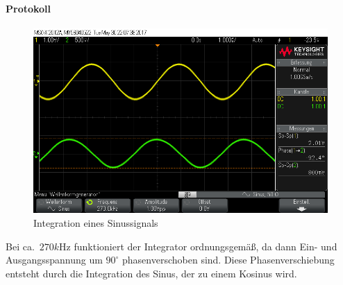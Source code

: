 \documentclass[10pt]{scrreprt}
\begin{document}
    \paragraph{Protokoll}
    \begin{center}
        \begin{figure}[H]
            \includegraphics[width=\textwidth]{scope_7.png}
            \caption{Integration eines Sinussignals}
        \end{figure}
    \end{center}

    Bei ca.~$270\si{k\hertz}$ funktioniert der Integrator ordnungsgemäß, da dann
    Ein- und Ausgangsspannung um $90^\circ$ phasenverschoben sind.
    Diese Phasenverschiebung entsteht durch die Integration des Sinus, der zu einem
    Kosinus wird.
\end{document}
